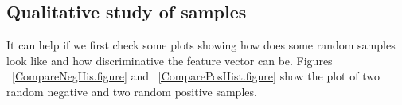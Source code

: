 \subsection{Qualitative study of samples}
\label{QStudy.ssec}

It can help if we first check some plots showing how does some random samples look like and how discriminative the feature vector 
can be.
Figures ~\ref{CompareNegHis.figure} and ~\ref{ComparePosHist.figure} show the plot of two random negative and two random 
positive samples.   
\begin{figure}[htp]
  \begin{center}

\end{center}
\end{figure}
